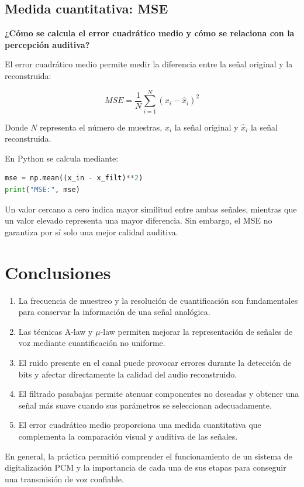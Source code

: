 \documentclass[12pt,a4paper]{article}
\begin{document}
\subsection{Medida cuantitativa: MSE}

\textbf{¿Cómo se calcula el error cuadrático medio y cómo
se relaciona con la percepción auditiva?}

El error cuadrático medio permite medir la diferencia
entre la señal original y la reconstruida:

\[
MSE=\frac{1}{N}\sum_{i=1}^{N}
(x_i-\hat{x}_i)^2
\]

Donde $N$ representa el número de muestras, $x_i$ la
señal original y $\hat{x}_i$ la señal reconstruida.

En Python se calcula mediante:

\begin{lstlisting}[language=Python]
mse = np.mean((x_in - x_filt)**2)
print("MSE:", mse)
\end{lstlisting}

Un valor cercano a cero indica mayor similitud entre
ambas señales, mientras que un valor elevado representa
una mayor diferencia. Sin embargo, el MSE no garantiza
por sí solo una mejor calidad auditiva.

\section{Conclusiones}

\begin{enumerate}
    \item La frecuencia de muestreo y la resolución de
    cuantificación son fundamentales para conservar
    la información de una señal analógica.

    \item Las técnicas A-law y $\mu$-law permiten mejorar
    la representación de señales de voz mediante
    cuantificación no uniforme.

    \item El ruido presente en el canal puede provocar
    errores durante la detección de bits y afectar
    directamente la calidad del audio reconstruido.

    \item El filtrado pasabajas permite atenuar componentes
    no deseadas y obtener una señal más suave cuando
    sus parámetros se seleccionan adecuadamente.

    \item El error cuadrático medio proporciona una medida
    cuantitativa que complementa la comparación visual
    y auditiva de las señales.
\end{enumerate}

En general, la práctica permitió comprender el funcionamiento
de un sistema de digitalización PCM y la importancia de
cada una de sus etapas para conseguir una transmisión
de voz confiable.
\end{document}
